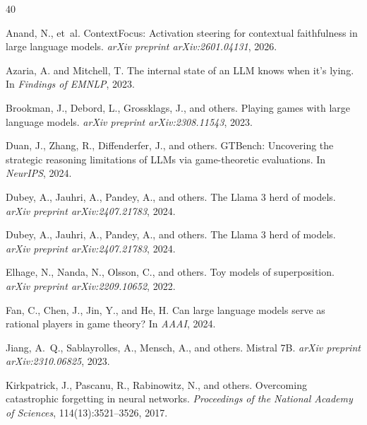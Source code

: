\documentclass{article}
\begin{document}
{\small

\begin{thebibliography}{40}

Anand, N., et~al.
\newblock ContextFocus: Activation steering for contextual faithfulness in large language models.
\newblock \textit{arXiv preprint arXiv:2601.04131}, 2026.

Azaria, A. and Mitchell, T.
\newblock The internal state of an LLM knows when it's lying.
\newblock In \textit{Findings of EMNLP}, 2023.

Brookman, J., Debord, L., Grossklags, J., and others.
\newblock Playing games with large language models.
\newblock \textit{arXiv preprint arXiv:2308.11543}, 2023.

Duan, J., Zhang, R., Diffenderfer, J., and others.
\newblock GTBench: Uncovering the strategic reasoning limitations of LLMs via game-theoretic evaluations.
\newblock In \textit{NeurIPS}, 2024.


Dubey, A., Jauhri, A., Pandey, A., and others.
\newblock The Llama 3 herd of models.
\newblock \textit{arXiv preprint arXiv:2407.21783}, 2024.

Dubey, A., Jauhri, A., Pandey, A., and others.
\newblock The Llama 3 herd of models.
\newblock \textit{arXiv preprint arXiv:2407.21783}, 2024.

Elhage, N., Nanda, N., Olsson, C., and others.
\newblock Toy models of superposition.
\newblock \textit{arXiv preprint arXiv:2209.10652}, 2022.

Fan, C., Chen, J., Jin, Y., and He, H.
\newblock Can large language models serve as rational players in game theory?
\newblock In \textit{AAAI}, 2024.


Jiang, A.~Q., Sablayrolles, A., Mensch, A., and others.
\newblock Mistral 7B.
\newblock \textit{arXiv preprint arXiv:2310.06825}, 2023.

Kirkpatrick, J., Pascanu, R., Rabinowitz, N., and others.
\newblock Overcoming catastrophic forgetting in neural networks.
\newblock \textit{Proceedings of the National Academy of Sciences}, 114(13):3521--3526, 2017.


\end{thebibliography}}
\end{document}
